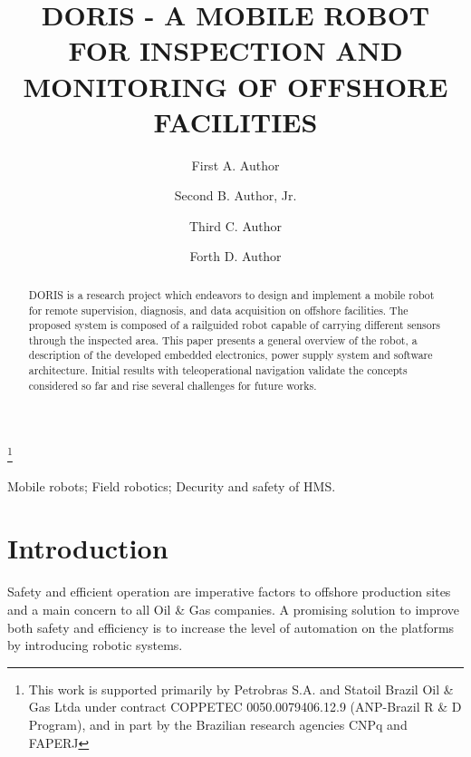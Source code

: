 \documentclass{ifacconf}
\begin{document}
\begin{frontmatter}

\title{DORIS - A MOBILE ROBOT FOR INSPECTION AND MONITORING OF
OFFSHORE FACILITIES} 

\thanks[footnoteinfo]{This work is supported primarily by Petrobras S.A. and
Statoil Brazil Oil \& Gas Ltda under contract COPPETEC 0050.0079406.12.9
(ANP-Brazil R \& D Program), and in part by the Brazilian research agencies CNPq
and FAPERJ}

\author[First]{First A. Author} 
\author[Second]{Second B. Author, Jr.} 
\author[Third]{Third C. Author}
\author[Forth]{Forth D. Author}

\address[First]{Research and Development Center, Petrobras/CENPES, Rio de
Janeiro, Brazil} 
\address[Second]{Mathematical Sciences and Technology Department, Norwegian
University of Life Sciences, Oslo, Norwegian }
\address[Third]{Electrical
Engineering Department, COPPE UFRJ, Rio de Janeiro, Brazil, (e-mail: )}
\address[Forth]{TPD RD New Development Solutions, Statoil ASA}

\begin{abstract}                %
DORIS is a research project which endeavors to design and implement a mobile
robot for remote supervision, diagnosis, and data acquisition on offshore
facilities. The proposed system is composed of a railguided robot capable of
carrying different sensors through the inspected area. This paper presents a
general overview of the robot, a description of the developed embedded
electronics, power supply system and software architecture. Initial results
with teleoperational navigation validate the concepts considered so far and
rise several challenges for future works.
\end{abstract}

\begin{keyword}
Mobile robots; Field robotics; Decurity and safety of HMS.
\end{keyword}

\end{frontmatter}

\section{Introduction}
Safety and efficient operation are imperative factors to offshore production
sites and a main concern to all Oil \& Gas companies. A promising solution to
improve both safety and efficiency is to increase the level of automation on
the platforms by introducing robotic systems.
\end{document}
